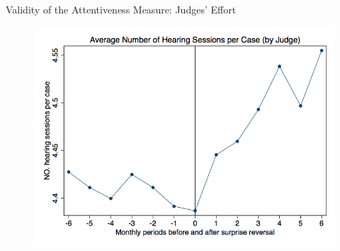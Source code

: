 \begin{frame}{Validity of the Attentiveness Measure: Judges' Effort}
    \begin{figure}
        \centering
        \includegraphics[height = 0.6 \textheight]{images/hearing_num.png}
    \end{figure}
\end{frame}

